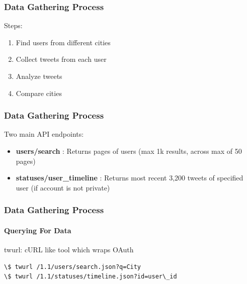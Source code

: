 \documentclass[pdf]{beamer}
\begin{document}
\begin{frame}
  \frametitle{Data Gathering Process}
  Steps:
  \begin{enumerate}
  \item Find users from different cities 
  \item Collect tweets from each user
  \item Analyze tweets 
  \item Compare cities
  \end{enumerate}
\end{frame}

\begin{frame}
  \frametitle{Data Gathering Process}
  Two main API endpoints:
  \begin{itemize}
  \item \textbf{users/search} : Returns pages of users (max 1k results, across max of 50 pages)

  \item \textbf{statuses/user\_timeline} : Returns most recent 3,200 tweets of specified user
    (if account is not private)
  \end{itemize}
\end{frame}

\begin{frame}[fragile]
  \frametitle{Data Gathering Process}
  \framesubtitle{Querying For Data}
  twurl: cURL like tool which wraps OAuth
  \begin{verbatim}
\$ twurl /1.1/users/search.json?q=City
\$ twurl /1.1/statuses/timeline.json?id=user\_id
\end{verbatim}
\end{frame}
\end{document}

